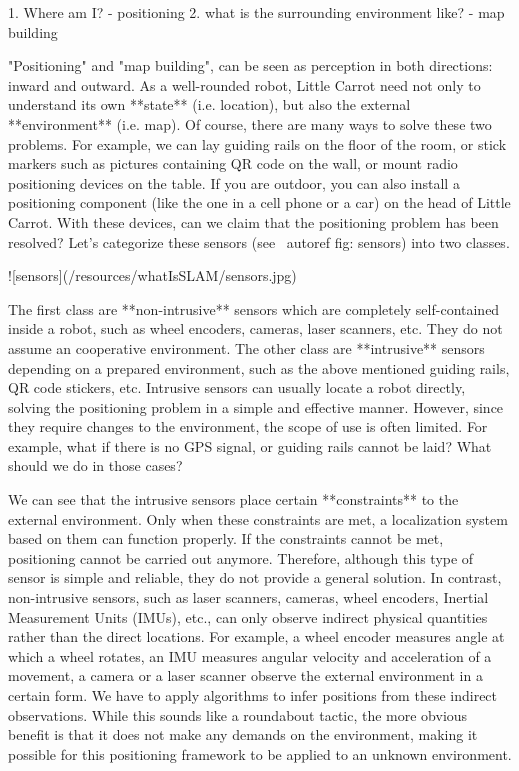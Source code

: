 1. Where am I? - positioning
2. what is the surrounding environment like? - map building

"Positioning" and "map building", can be seen as perception in both directions: inward and outward. As a well-rounded robot, Little Carrot need not only to understand its own **state** (i.e. location), but also the external **environment** (i.e. map). Of course, there are many ways to solve these two problems. For example, we can lay guiding rails on the floor of the room, or stick markers such as pictures containing QR code on the wall, or mount radio positioning devices on the table. If you are outdoor, you can also install a positioning component (like the one in a cell phone or a car) on the head of Little Carrot. With these devices, can we claim that the positioning problem has been resolved? Let's categorize these sensors (see \ autoref {fig: sensors}) into two classes.

![sensors](/resources/whatIsSLAM/sensors.jpg)

The first class are **non-intrusive** sensors which are completely self-contained inside a robot, such as wheel encoders, cameras, laser scanners, etc. They do not assume an cooperative environment. The other class are **intrusive** sensors depending on a prepared environment, such as the above mentioned guiding rails, QR code stickers, etc. Intrusive sensors can usually locate a robot directly, solving the positioning problem in a simple and effective manner. However, since they require changes to the environment, the scope of use is often limited. For example, what if there is no GPS signal, or guiding rails cannot be laid? What should we do in those cases?

We can see that the intrusive sensors place certain **constraints** to the external environment. Only when these constraints are met, a localization system based on them can function properly. If the constraints cannot be met, positioning cannot be carried out anymore. Therefore, although this type of sensor is simple and reliable, they do not provide a general solution. In contrast, non-intrusive sensors, such as laser scanners, cameras, wheel encoders, Inertial Measurement Units (IMUs), etc., can only observe indirect physical quantities rather than the direct locations. For example, a wheel encoder measures angle at which a wheel rotates, an IMU measures angular velocity and acceleration of a movement, a camera or a laser scanner observe the external environment in a certain form. We have to apply algorithms to infer positions from these indirect observations. While this sounds like a roundabout tactic, the more obvious benefit is that it does not make any demands on the environment, making it possible for this positioning framework to be applied to an unknown environment.

